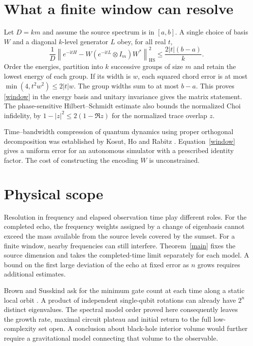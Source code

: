 \documentclass[11pt]{article}
\newcommand{\ii}{\mathrm{i}}
\newcommand{\HS}{\mathrm{HS}}
\begin{document}
\section{What a finite window can resolve}
Let $D=km$ and assume the source spectrum is in $[a,b]$. A single choice of basis $W$ and a diagonal $k$-level generator $L$ obey, for all real $t$,
\begin{equation}\label{window}
 \frac1D\left\|e^{-\ii tH}-W(e^{-\ii tL}\otimes I_m)W^*\right\|_{\HS}^2
          \le \frac{2|t|(b-a)}{k}.
\end{equation}
Order the energies, partition into $k$ successive groups of size $m$ and retain the lowest energy of each group. If its width is $w$, each squared chord error is at most $\min(4,t^2w^2)\le2|t|w$. The group widths sum to at most $b-a$. This proves \eqref{window} in the energy basis and unitary invariance gives the matrix statement. The phase-sensitive Hilbert--Schmidt estimate also bounds the normalized Choi infidelity, by $1-|z|^2\le2(1-\Re z)$ for the normalized trace overlap $z$.

Time--bandwidth compression of quantum dynamics using proper orthogonal decomposition was established by Kosut, Ho and Rabitz \cite{kosut}. Equation~\eqref{window} gives a uniform error for an autonomous simulator with a prescribed identity factor. The cost of constructing the encoding $W$ is unconstrained.

\section{Physical scope}
Resolution in frequency and elapsed observation time play different roles. For the completed echo, the frequency weights assigned by a change of eigenbasis cannot exceed the mass available from the source levels covered by the sumset. For a finite window, nearby frequencies can still interfere. Theorem~\ref{main} fixes the source dimension and takes the completed-time limit separately for each model. A bound on the first large deviation of the echo at fixed error as $n$ grows requires additional estimates.

Brown and Susskind ask for the minimum gate count at each time along a static local orbit \cite{brown}. A product of independent single-qubit rotations can already have $2^n$ distinct eigenvalues. The spectral model order proved here consequently leaves the growth rate, maximal circuit plateau and initial return to the full low-complexity set open. A conclusion about black-hole interior volume would further require a gravitational model connecting that volume to the observable.
\end{document}
